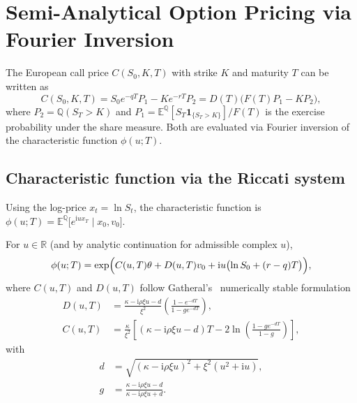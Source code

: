 \documentclass[11pt,a4paper]{article}
\theoremstyle{plain}
\theoremstyle{definition}
\newcommand{\E}{\mathbb{E}}
\newcommand{\Q}{\mathbb{Q}}
\newcommand{\R}{\mathbb{R}}
\newcommand{\ind}{\mathbf{1}}
\newcommand{\iu}{\mathrm{i}}
\begin{document}
\clearpage
\section{Semi-Analytical Option Pricing via Fourier Inversion}
\label{sec:pricing}

The European call price $C(S_0, K, T)$ with strike $K$ and maturity $T$ can be written as
\begin{equation}
    C(S_0, K, T) = S_0 e^{-q T} P_1 - K e^{-r T} P_2 = D(T)\bigl(F(T)P_1-KP_2\bigr),
    \label{eq:call-P1P2}
\end{equation}
where $P_2=\Q(S_T>K)$ and $P_1=\E^{\Q}[S_T\ind_{\{S_T>K\}}]/F(T)$ is the exercise probability under the share measure. Both are evaluated via Fourier inversion of the characteristic function $\phi(u; T)$.

\subsection{Characteristic function via the Riccati system}
Using the log-price $x_t = \ln S_t$, the characteristic function is $\phi(u;T) = \E^{\Q}\bigl[ e^{\iu u x_T} \mid x_0, v_0 \bigr]$.


For $u\in\R$ (and by analytic continuation for admissible complex $u$),
\begin{equation}
    \phi(u; T) = \exp\Bigl( C(u, T)\theta + D(u, T) v_0 + \iu u \bigl( \ln S_0 + (r - q) T \bigr) \Bigr),
    \label{eq:cf}
\end{equation}
where $C(u,T)$ and $D(u,T)$ follow Gatheral's~\cite{gatheral} numerically stable formulation
\begin{align}
    D(u, T) &= \frac{\kappa - \iu \rho \xi u - d}{\xi^2} \left( \frac{1 - e^{-d T}}{1 - g e^{-d T}} \right), \label{eq:D}\\
    C(u, T) &= \frac{\kappa}{\xi^2} \left[ (\kappa - \iu \rho \xi u - d) T - 2 \ln \left( \frac{1 - g e^{-d T}}{1 - g} \right) \right], \label{eq:C}
\end{align}
with
\begin{align}
    d &= \sqrt{(\kappa - \iu \rho \xi u)^2 + \xi^2 (u^2 + \iu u)}, \label{eq:d}\\
    g &= \frac{\kappa - \iu \rho \xi u - d}{\kappa - \iu \rho \xi u + d}. \label{eq:g}
\end{align}
\end{document}
